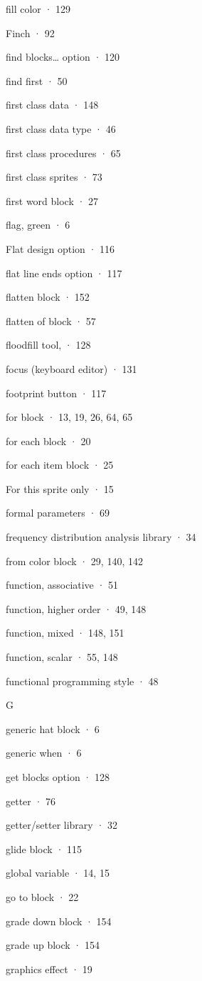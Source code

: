 \documentclass[
  letterpaper,
]{book}
\begin{document}
fill color · 129

Finch · 92

find blocks\ldots{} option · 120

find first · 50

first class data · 148

first class data type · 46

ﬁrst class procedures · 65

ﬁrst class sprites · 73

first word block · 27

flag, green · 6

Flat design option · 116

flat line ends option · 117

flatten block · 152

flatten of block · 57

floodfill tool, · 128

focus (keyboard editor) · 131

footprint button · 117

for block · 13, 19, 26, 64, 65

for each block · 20

for each item block · 25

For this sprite only · 15

formal parameters · 69

frequency distribution analysis library · 34

from color block · 29, 140, 142

function, associative · 51

function, higher order · 49, 148

function, mixed · 148, 151

function, scalar · 55, 148

functional programming style · 48

G

generic hat block · 6

generic when · 6

get blocks option · 128

getter · 76

getter/setter library · 32

glide block · 115

global variable · 14, 15

go to block · 22

grade down block · 154

grade up block · 154

graphics effect · 19
\end{document}
